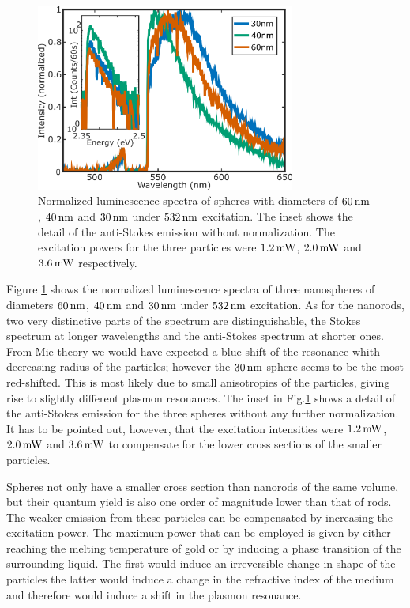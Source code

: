 \begin{figure}[tp] \centering
\includegraphics[width=85.2mm]{Chapters/04_Anti-Stokes/Figures/07_Spheres/07_spheres.png}
\caption{Normalized luminescence spectra of spheres with diameters of $60\,\textrm{nm}$,
$40\,\textrm{nm}$ and $30\,\textrm{nm}$ under $532\,\textrm{nm}$ excitation. The inset shows the detail of the anti-Stokes emission without normalization.
The excitation powers for the three particles were $1.2\,\textrm{mW}$, $2.0\,\textrm{mW}$ and
$3.6\,\textrm{mW}$ respectively.}
	\label{fig:spheres}
\end{figure}

Figure \ref{fig:spheres} shows the normalized luminescence spectra of three
nanospheres of diameters $60\,\textrm{nm}$, $40\,\textrm{nm}$ and $30\,\textrm{nm}$ under $532\,\textrm{nm}$ excitation.
As for the nanorods, two very distinctive parts of the spectrum are
distinguishable, the Stokes spectrum at longer wavelengths and the anti-Stokes
spectrum at shorter ones. From Mie theory we would have expected a blue
shift of the resonance whith decreasing radius of the particles; however the
$30\,\textrm{nm}$ sphere seems to be the most red-shifted. This is most likely due to small anisotropies of the
particles, giving rise to slightly different plasmon resonances. The inset in
Fig.\ref{fig:spheres} shows a detail of the anti-Stokes emission for the three
spheres without any further normalization. It has to be pointed out, however,
that the excitation intensities were $1.2\,\textrm{mW}$, $2.0\,\textrm{mW}$ and $3.6\,\textrm{mW}$ to
compensate for the lower cross sections of the smaller particles.

Spheres not only have a smaller cross section than nanorods of the same volume,
but their quantum yield is also one order of magnitude lower than that of
rods\cite{Yorulmaz2012}. The weaker emission from these particles can be
compensated by increasing the excitation power. The maximum power that can be
employed is given by either reaching the melting temperature of gold or by
inducing a phase transition of the surrounding liquid. The first would induce an
irreversible change in shape of the particles\cite{Zijlstra2009a} the latter
would induce a change in the refractive index of the medium and therefore would
induce a shift in the plasmon resonance\cite{Hou2015}.

